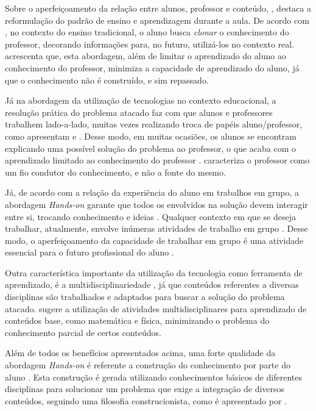 Sobre o aperfeiçoamento da relação entre alunos, professor e conteúdo, \cite{construcionismoPapert}, destaca a reformulação do padrão de ensino e aprendizagem durante a aula. De acordo com \cite{construcionismoPapert}, no contexto do ensino tradicional, o aluno busca \textit{clonar} o conhecimento do professor, decorando informações para, no futuro, utilizá-los no contexto real. \cite{roboticaEducativaEnsinoMedio} acrescenta que, esta abordagem, além de limitar o aprendizado do aluno ao conhecimento do professor, minimiza a capacidade de aprendizado do aluno, já que o conhecimento não é construído, e sim repassado.

Já na abordagem da utilização de tecnologias no contexto educacional, a resolução prática do problema atacado faz com que alunos e professores trabalhem lado-a-lado, muitas vezes realizando troca de papéis aluno/professor, como apresentam \cite{construcionismoPapert} e \cite{daMaquinaDeEnsinarAMaquinaDeAprender}. Desse modo, em muitas ocasiões, os alunos se encontram explicando uma possível solução do problema ao professor, o que acaba com o aprendizado limitado ao conhecimento do professor \cite{PCsEConstrucionismo}. \cite{construcionismoPapert} caracteriza o professor como um fio condutor do conhecimento, e não a fonte do mesmo.

Já, de acordo com a relação da experiência do aluno em trabalhos em grupo, a abordagem \textit{Hands-on} garante que todos os envolvidos na solução devem interagir entre si, trocando conhecimento e ideias \cite{teachingWithRoboticKit}. Qualquer contexto em que se deseja trabalhar, atualmente, envolve inúmeras atividades de trabalho em grupo \cite{teachingWithRoboticKit}. Desse modo, o aperfeiçoamento da capacidade de trabalhar em grupo é uma atividade essencial para o futuro profissional do aluno \cite{PCsEConstrucionismo}.

Outra característica importante da utilização da tecnologia como ferramenta de aprendizado, é a multidisciplinariedade \cite{analiseFerramentaEnsinoComputacao}, já que conteúdos referentes a diversas disciplinas são trabalhados e adaptados para buscar a solução do problema atacado. \cite{teachingWithRoboticKit} sugere a utilização de atividades multidisciplinares para aprendizado de conteúdos base, como matemática e física, minimizando o problema do conhecimento parcial de certos conteúdos.

Além de todos os benefícios apresentados acima, uma forte qualidade da abordagem \textit{Hands-on} é referente a construção do conhecimento por parte do aluno \cite{PCsEConstrucionismo}. Esta construção é gerada utilizando conhecimentos básicos de diferentes disciplinas para solucionar um problema que exige a integração de diversos conteúdos, seguindo uma filosofia construcionista, como é apresentado por \cite{construcionismoPapert}.
 
